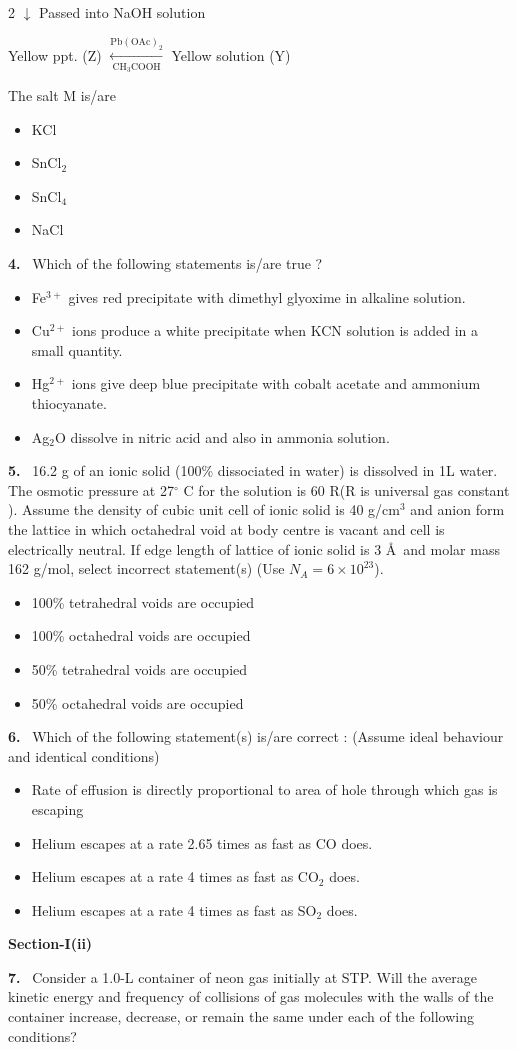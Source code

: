 \documentclass[10pt]{extarticle}
\newcommand{\sect}[1]{\par\smallskip\noindent\textbf{#1}\par}
\newcommand{\qn}[1]{\par\smallskip\noindent\textbf{#1.}~}
\newenvironment{qoptions}{\begin{itemize}[leftmargin=1.8em,itemsep=1pt,topsep=2pt,label={}]}{\end{itemize}}
\newcommand{\opt}[2]{\item[(#1)] #2}
\begin{document}
\begin{multicols}{2}
\hspace{2em}$\downarrow$ Passed into NaOH solution

Yellow ppt. (Z) $\xleftarrow[\mathrm{CH_3COOH}]{\mathrm{Pb(OAc)_2}}$ Yellow solution (Y)

The salt M is/are
\begin{qoptions}
\opt{A}{KCl}
\opt{B}{SnCl$_2$}
\opt{C}{SnCl$_4$}
\opt{D}{NaCl}
\end{qoptions}
\qn{4} Which of the following statements is/are true ?
\begin{qoptions}
\opt{A}{Fe$^{3+}$ gives red precipitate with dimethyl glyoxime in alkaline solution.}
\opt{B}{Cu$^{2+}$ ions produce a white precipitate when KCN solution is added in a small quantity.}
\opt{C}{Hg$^{2+}$ ions give deep blue precipitate with cobalt acetate and ammonium thiocyanate.}
\opt{D}{Ag$_2$O dissolve in nitric acid and also in ammonia solution.}
\end{qoptions}
\qn{5} 16.2 g of an ionic solid (100\% dissociated in water) is dissolved in 1L water. The osmotic pressure at 27$^\circ$ C for the solution is 60 R(R is universal gas constant ). Assume the density of cubic unit cell of ionic solid is 40 g/cm$^3$ and anion form the lattice in which octahedral void at body centre is vacant and cell is electrically neutral. If edge length of lattice of ionic solid is 3 \AA\ and molar mass 162 g/mol, select incorrect statement(s) (Use $N_A=6\times10^{23}$).
\begin{qoptions}
\opt{A}{100\% tetrahedral voids are occupied}
\opt{B}{100\% octahedral voids are occupied}
\opt{C}{50\% tetrahedral voids are occupied}
\opt{D}{50\% octahedral voids are occupied}
\end{qoptions}
\qn{6} Which of the following statement(s) is/are correct : (Assume ideal behaviour and identical conditions)
\begin{qoptions}
\opt{A}{Rate of effusion is directly proportional to area of hole through which gas is escaping}
\opt{B}{Helium escapes at a rate 2.65 times as fast as CO does.}
\opt{C}{Helium escapes at a rate 4 times as fast as CO$_2$ does.}
\opt{D}{Helium escapes at a rate 4 times as fast as SO$_2$ does.}
\end{qoptions}
\sect{Section-I(ii)}
\qn{7} Consider a 1.0-L container of neon gas initially at STP. Will the average kinetic energy and frequency of collisions of gas molecules with the walls of the container increase, decrease, or remain the same under each of the following conditions?
\begin{center}\small\setlength{\tabcolsep}{3pt}

\end{center}
\end{multicols}
\end{document}
